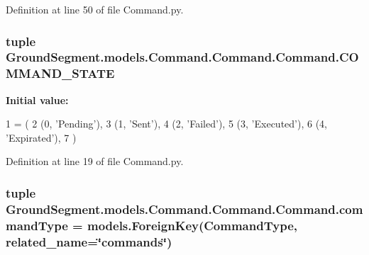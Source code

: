 Definition at line 50 of file Command.\+py.

\hypertarget{class_ground_segment_1_1models_1_1_command_1_1_command_1_1_command_a59849751ec75c3c110fe1dabedd60654}{}
\subsubsection[{C\+O\+M\+M\+A\+N\+D\+\_\+\+S\+T\+A\+T\+E}]{\setlength{\rightskip}{0pt plus 5cm}tuple Ground\+Segment.\+models.\+Command.\+Command.\+Command.\+C\+O\+M\+M\+A\+N\+D\+\_\+\+S\+T\+A\+T\+E\hspace{0.3cm}{\ttfamily [static]}}\label{class_ground_segment_1_1models_1_1_command_1_1_command_1_1_command_a59849751ec75c3c110fe1dabedd60654}
{\bfseries Initial value\+:}
\begin{DoxyCode}
1 = (
2         (0, \textcolor{stringliteral}{'Pending'}),
3         (1, \textcolor{stringliteral}{'Sent'}),
4         (2, \textcolor{stringliteral}{'Failed'}),
5         (3, \textcolor{stringliteral}{'Executed'}),
6         (4, \textcolor{stringliteral}{'Expirated'}),
7     )
\end{DoxyCode}


Definition at line 19 of file Command.\+py.

\hypertarget{class_ground_segment_1_1models_1_1_command_1_1_command_1_1_command_a8b7882e00f489b55791e10afdb35ce0c}{}
\subsubsection[{command\+Type}]{\setlength{\rightskip}{0pt plus 5cm}tuple Ground\+Segment.\+models.\+Command.\+Command.\+Command.\+command\+Type = models.\+Foreign\+Key({\bf Command\+Type}, related\+\_\+name=\char`\"{}commands\char`\"{})\hspace{0.3cm}{\ttfamily [static]}}\label{class_ground_segment_1_1models_1_1_command_1_1_command_1_1_command_a8b7882e00f489b55791e10afdb35ce0c}


